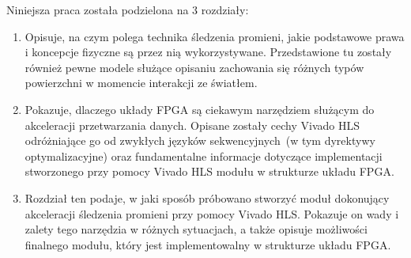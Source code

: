 {Niniejsza praca została podzielona na 3 rozdziały:
\begin{enumerate}
\item Opisuje, na czym polega technika śledzenia promieni, jakie podstawowe prawa i koncepcje fizyczne są przez nią wykorzystywane. Przedstawione tu zostały również pewne modele służące opisaniu zachowania się różnych typów powierzchni w momencie interakcji ze światłem.
\item Pokazuje, dlaczego układy FPGA są ciekawym narzędziem służącym do akceleracji przetwarzania danych. Opisane zostały cechy Vivado HLS odróżniające go od zwykłych języków sekwencyjnych~(w tym dyrektywy optymalizacyjne) oraz fundamentalne informacje dotyczące  implementacji stworzonego przy pomocy Vivado HLS modułu w strukturze układu FPGA.
\item Rozdział ten podaje, w jaki sposób próbowano stworzyć moduł dokonujący akceleracji śledzenia promieni przy pomocy Vivado HLS. Pokazuje on wady i zalety tego narzędzia w różnych sytuacjach, a także opisuje możliwości finalnego modułu, który jest implementowalny w strukturze układu FPGA. 
\end{enumerate}
}
